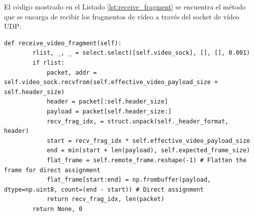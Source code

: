 El código mostrado en el Listado \ref{lst:receive_fragment} se encuentra el método que se encarga de recibir los fragmentos de vídeo a través del socket de vídeo UDP:
\begin{lstlisting}[style=pythonstyle, caption={Método \texttt{receive\_video\_fragment()} de \textit{Minimal\_Video}.}, label={lst:receive_fragment}]
def receive_video_fragment(self):
        rlist, _, _ = select.select([self.video_sock], [], [], 0.001)
        if rlist:
            packet, addr = self.video_sock.recvfrom(self.effective_video_payload_size + self.header_size)
            header = packet[:self.header_size]
            payload = packet[self.header_size:]
            recv_frag_idx, = struct.unpack(self._header_format, header)
            start = recv_frag_idx * self.effective_video_payload_size
            end = min(start + len(payload), self.expected_frame_size)
            flat_frame = self.remote_frame.reshape(-1) # Flatten the frame for direct assignment
            flat_frame[start:end] = np.frombuffer(payload, dtype=np.uint8, count=(end - start)) # Direct assignment
            return recv_frag_idx, len(packet)
        return None, 0
\end{lstlisting}

